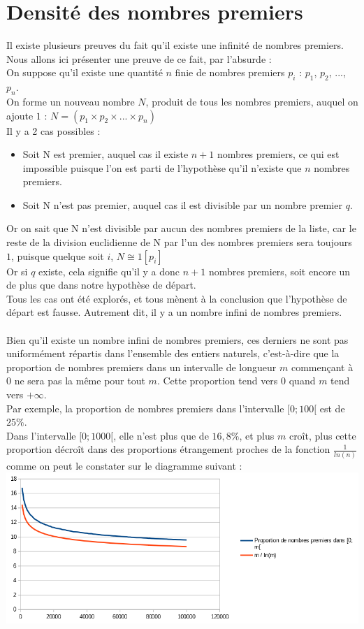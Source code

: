 	\section{Densité des nombres premiers}
		Il existe plusieurs preuves du fait qu'il existe une infinité de nombres premiers. Nous allons ici présenter une preuve de ce fait, par l'absurde :\\
		On suppose qu'il existe une quantité $n$ finie de nombres premiers $p_i$ : $p_1$, $p_2$, $...$, $p_n$.\\
		On forme un nouveau nombre $N$, produit de tous les nombres premiers, auquel on ajoute $1$ : $N = (p_1 \times p_2 \times ... \times p_n)$\\
		Il y a 2 cas possibles :
		\begin{itemize}
			\item Soit N est premier, auquel cas il existe $n + 1$ nombres premiers, ce qui est impossible puisque l'on est parti de l'hypothèse qu'il n'existe que $n$ nombres premiers.
			\item Soit N n'est pas premier, auquel cas il est divisible par un nombre premier $q$.
		\end{itemize}
		Or on sait que N n'est divisible par aucun des nombres premiers de la liste, car le reste de la division euclidienne de N par l'un des nombres premiers sera toujours $1$, puisque quelque soit $i$, $N \cong 1 [p_i]$\\
		Or si $q$ existe, cela signifie qu'il y a donc $n + 1$ nombres premiers, soit encore un de plus que dans notre hypothèse de départ.\\
		Tous les cas ont été explorés, et tous mènent à la conclusion que l'hypothèse de départ est fausse. Autrement dit, il y a un nombre infini de nombres premiers.\\
		\\
		Bien qu'il existe un nombre infini de nombres premiers, ces derniers ne sont pas uniformément répartis dans l'ensemble des entiers naturels, c'est-à-dire que la proportion de nombres premiers dans un intervalle de longueur $m$ commençant à 0 ne sera pas la même pour tout $m$. Cette proportion tend vers $0$ quand $m$ tend vers $+\infty$.\\
		Par exemple, la proportion de nombres premiers dans l'intervalle $[0;100[$ est de $25\%$.\\
		Dans l'intervalle $[0;1000[$, elle n'est plus que de $16,8\%$, et plus $m$ croît, plus cette proportion décroît dans des proportions étrangement proches de la fonction $\frac{1}{ln(n)}$ comme on peut le constater sur le diagramme suivant :\\
		\includegraphics{prop_premier.png}